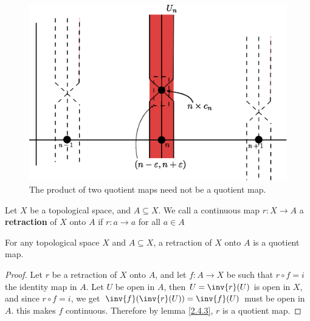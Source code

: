 \begin{example}
\begin{enumerate}
            \begin{figure}[h]
                \centering
                \includegraphics[scale=0.5]{Figures/Chapter2/figure22_8.eps}
                \caption{The product of two quotient maps need not be a quotient
                map.}
                \label{fig_2.8}
            \end{figure}
    \end{enumerate}
\end{example}

\begin{definition}
    Let $X$ be a topological space, and  $A \subseteq X$. We call a continuous
    map $r:X \rightarrow A$ a \textbf{retraction} of $X$ onto  $A$ if
    $r:a \rightarrow a$ for all $a \in A$
\end{definition}

\begin{lemma}\label{2.4.7}
    For any topological space $X$ and  $A \subseteq X$, a retraction of  $X$
    onto  $A$ is a quotient map.
\end{lemma}
\begin{proof}
    Let $r$ be a retraction of  $X$ onto  $A$, and let  $f:A \rightarrow X$ be
    such that $r \circ f=i$ the identity map in  $A$. Let  $U$ be open in  $A$,
    then  $U=\inv{r}(U)$ is open in $X$, and since  $r \circ f=i$, we get
    $\inv{f}(\inv{r}(U))=\inv{f}(U)$ must be open in $A$. this makes  $f$
    continuous. Therefore by lemma \ref {2.4.3}, $r$ is a quotient map.
\end{proof}
